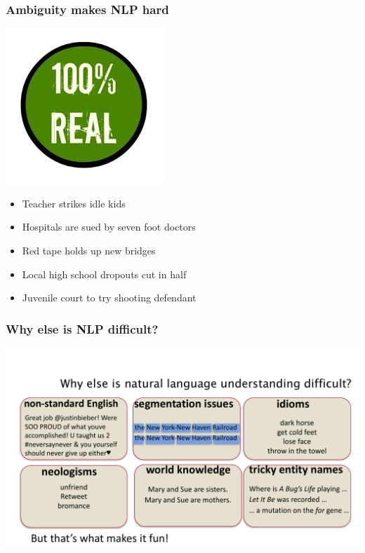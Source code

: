 \documentclass[dvipsnames]{beamer}
\begin{document}
\begin{frame}
\frametitle{Ambiguity makes NLP hard}
\hfill
\includegraphics[scale=0.4]{real}

\begin{itemize}
\vspace{-1cm}
\item Teacher strikes idle kids
\item Hospitals are sued by seven foot doctors
\item Red tape holds up new bridges
\item Local high school dropouts cut in half
\item Juvenile court to try shooting defendant  
\end{itemize}
\end{frame}

\begin{frame}
\frametitle{Why else is NLP difficult?}
\noindent
\hspace{-0.65cm}
\includegraphics[scale=0.5]{difficulties}
\end{frame}
\end{document}
